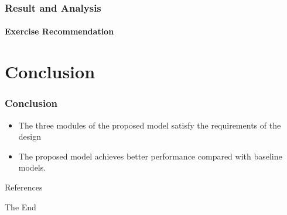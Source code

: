 \documentclass{beamer}
\begin{document}
\begin{frame}
  \frametitle{Result and Analysis}
  \framesubtitle{Exercise Recommendation}
  \begin{table}[htb]
    \caption{The performance comparison between baseline and proposed recommendation models.}\label{tbl:ch4-exp-result}
    \centering
  \end{table}
\end{frame}


\section{Conclusion}
\begin{frame}
  \frametitle{Conclusion}
  \begin{itemize}
    \item The three modules of the proposed model satisfy the requirements of the design
    \item The proposed model achieves better performance compared with baseline models.
  \end{itemize}
\end{frame}

\begin{frame}[allowframebreaks]{References}
  
  
\end{frame}


\begin{frame}
  \Huge{\centerline{The End}}
\end{frame}

\end{document}
